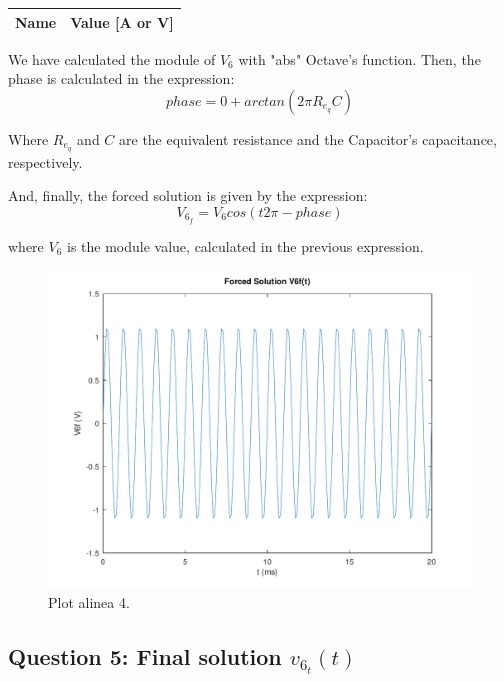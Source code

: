 \begin{center}
  \begin{tabular}{ | c | c | }
    \hline    
    {\bf Name} & {\bf Value [A or V]} \\ \hline
    
    \hline
  \end{tabular}
\end{center}

We have calculated the module of $V_6$ with "abs" Octave's function. Then, the phase is calculated in the expression:
\begin{equation}
     phase = 0 + arctan({2\pi}{R_{e_q}}{C})
\end{equation}\par

Where $R_{e_q}$ and $C$ are the equivalent resistance and the Capacitor's capacitance, respectively.

And, finally, the forced solution is given by the expression:
\begin{equation}
     V_{6_f}= V_6cos({t}{2\pi} - phase)
\end{equation}\par
where $V_6$ is the module value, calculated in the previous expression.

\begin{figure}[H] \centering
\includegraphics[width=0.7\linewidth]{../mat/alinea4.pdf}
\caption{Plot alinea 4.}
\label{fig:plot4}
\end{figure}


\subsection{Question 5: Final solution $v_{6_t}(t)$ }




